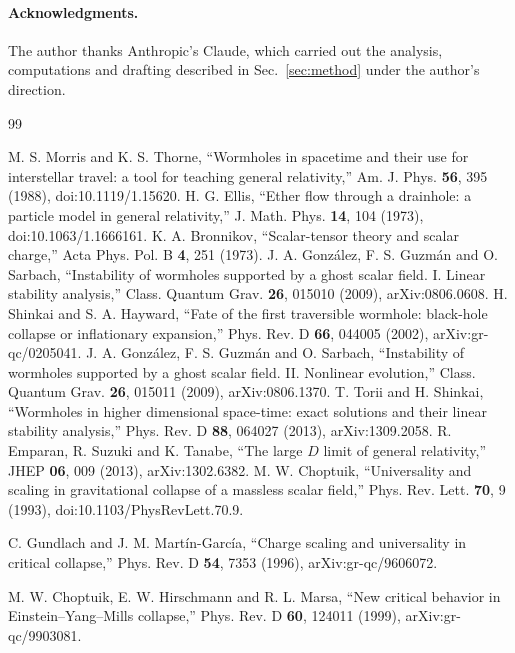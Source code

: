 \documentclass[11pt]{article}
\theoremstyle{remark}
\begin{document}
\paragraph{Acknowledgments.} The author thanks Anthropic's Claude, which carried out the analysis, computations and
drafting described in Sec.~\ref{sec:method} under the author's direction.

\begin{thebibliography}{99}

 M. S. Morris and K. S. Thorne, ``Wormholes in spacetime and their use for interstellar travel: a tool
for teaching general relativity,'' Am. J. Phys. \textbf{56}, 395 (1988), doi:10.1119/1.15620.
 H. G. Ellis, ``Ether flow through a drainhole: a particle model in general relativity,'' J. Math.
Phys. \textbf{14}, 104 (1973), doi:10.1063/1.1666161.
 K. A. Bronnikov, ``Scalar-tensor theory and scalar charge,'' Acta Phys. Pol. B \textbf{4}, 251
(1973).
 J. A. González, F. S. Guzmán and O. Sarbach, ``Instability of wormholes supported by a ghost scalar
field. I. Linear stability analysis,'' Class. Quantum Grav. \textbf{26}, 015010 (2009), arXiv:0806.0608.
 H. Shinkai and S. A. Hayward, ``Fate of the first traversible wormhole: black-hole collapse or
inflationary expansion,'' Phys. Rev. D \textbf{66}, 044005 (2002), arXiv:gr-qc/0205041.
 J. A. González, F. S. Guzmán and O. Sarbach, ``Instability of wormholes supported by a ghost scalar
field. II. Nonlinear evolution,'' Class. Quantum Grav. \textbf{26}, 015011 (2009), arXiv:0806.1370.
 T. Torii and H. Shinkai, ``Wormholes in higher dimensional space-time: exact solutions and their
linear stability analysis,'' Phys. Rev. D \textbf{88}, 064027 (2013), arXiv:1309.2058.
 R. Emparan, R. Suzuki and K. Tanabe, ``The large $D$ limit of general relativity,'' JHEP
\textbf{06}, 009 (2013), arXiv:1302.6382.
 M. W. Choptuik, ``Universality and scaling in gravitational collapse of a massless scalar field,''
Phys. Rev. Lett. \textbf{70}, 9 (1993), doi:10.1103/PhysRevLett.70.9.

 C. Gundlach and J. M. Martín-García, ``Charge scaling and universality in critical collapse,'' Phys.
Rev. D \textbf{54}, 7353 (1996), arXiv:gr-qc/9606072.

 M. W. Choptuik, E. W. Hirschmann and R. L. Marsa, ``New critical behavior in Einstein--Yang--Mills
collapse,'' Phys. Rev. D \textbf{60}, 124011 (1999), arXiv:gr-qc/9903081.


\end{thebibliography}
\end{document}
